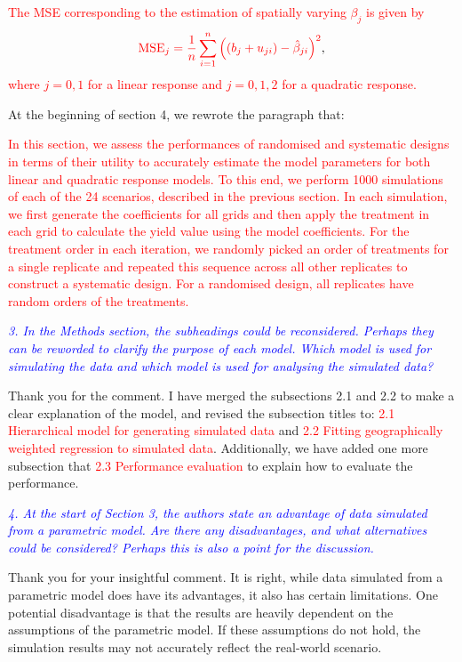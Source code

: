 \documentclass[a4paper]{article}   	%
\newcommand{\revision}[1]{\textcolor{red}{#1}}
\newcommand{\reviewer}[1]{\textcolor{blue}{\textit{#1}}}
\begin{document}
\revision{The MSE corresponding to the estimation of spatially varying $\beta_{j}$ is given by}
\begin{equation*}\label{eq:mse}
\revision{\text{MSE}_j = \frac{1}{n} \sum_{i=1}^{n} \left( (b_j+u_{ji}) - \hat{\beta}_{ji} \right)^2},
\end{equation*}
\revision{where $j = 0, 1$ for a linear response and $j = 0, 1, 2$ for a quadratic response.}



At the beginning of section 4, we rewrote the paragraph that: 

\revision{In this section, we assess the performances of randomised and systematic designs in terms of their utility to accurately estimate the model parameters for both linear and quadratic response models. To this end, we perform 1000 simulations of each of the 24 scenarios, described in the previous section. In each simulation, we first generate the coefficients for all grids and then apply the treatment in each grid to calculate the yield value using the model coefficients. For the treatment order in each iteration, we randomly picked an order of treatments for a single replicate and repeated this sequence across all other replicates to construct a systematic design. For a randomised design, all replicates have random orders of the treatments.}


\reviewer{3. In the Methods section, the subheadings could be reconsidered. Perhaps they can be reworded to clarify the purpose of each model. Which model is used for simulating the data and which model is used for analysing the simulated data?}

Thank you for the comment. I have merged the subsections 2.1 and 2.2 to make a clear explanation of the model, and revised the subsection titles to: \revision{2.1 Hierarchical model for generating simulated data} and \revision{2.2 Fitting geographically weighted regression to simulated data}. Additionally, we have added one more subsection that \revision{2.3 Performance evaluation} to explain how to evaluate the performance. 


\reviewer{4. At the start of Section 3, the authors state an advantage of data simulated from a parametric model. Are there any disadvantages, and what alternatives could be considered? Perhaps this is also a point for the discussion.}

Thank you for your insightful comment. It is right, while data simulated from a parametric model does have its advantages, it also has certain limitations. One potential disadvantage is that the results are heavily dependent on the assumptions of the parametric model. If these assumptions do not hold, the simulation results may not accurately reflect the real-world scenario.
\end{document}
